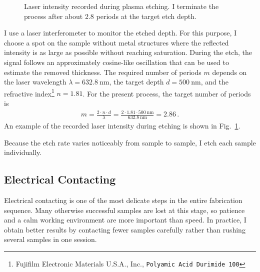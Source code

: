         \begin{figure}
            \captionsetup{format=plain}%
            \centering
            \vspace{-0.5em}
            \caption{
                Laser intensity recorded during plasma etching. I terminate the process after about 2.8 periods at the target etch depth.
                }
            \label{fig:methods:rie}
        \end{figure}
        
        I use a laser interferometer to monitor the etched depth. For this purpose, I choose a spot on the sample without metal structures where the reflected intensity is as large as possible without reaching saturation. During the etch, the signal follows an approximately cosine-like oscillation that can be used to estimate the removed thickness. The required number of periods $m$ depends on the laser wavelength $\lambda=\qty{632.8}{\nano\meter}$, the target depth $d=\qty{500}{\nano\meter}$, and the refractive index\footnote{Fujifilm Electronic Materials U.S.A., Inc., \texttt{Polyamic Acid Durimide 100}} $n=1.81$. For the present process, the target number of periods is
        \begin{align}
            m = \frac{2 \cdot n \cdot d}{\lambda} = \frac{2 \cdot 1.81 \cdot \qty{500}{\nano\meter}}{\qty{632.8}{\nano\meter}} = 2.86\,.
        \end{align}
        An example of the recorded laser intensity during etching is shown in Fig.~\ref{fig:methods:rie}.
        
        Because the etch rate varies noticeably from sample to sample, I etch each sample individually.

    \subsection*{Electrical Contacting}

        Electrical contacting is one of the most delicate steps in the entire fabrication sequence. Many otherwise successful samples are lost at this stage, so patience and a calm working environment are more important than speed. In practice, I obtain better results by contacting fewer samples carefully rather than rushing several samples in one session.

